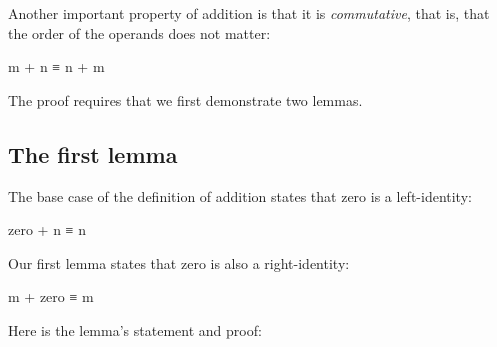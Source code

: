 Another important property of addition is that it is \emph{commutative},
that is, that the order of the operands does not matter:

\begin{myDisplay}
m + n ≡ n + m
\end{myDisplay}

The proof requires that we first demonstrate two lemmas.

\hypertarget{the-first-lemma}{%
\subsection{The first lemma}\label{the-first-lemma}}

The base case of the definition of addition states that zero is a
left-identity:

\begin{myDisplay}
zero + n ≡ n
\end{myDisplay}

Our first lemma states that zero is also a right-identity:

\begin{myDisplay}
m + zero ≡ m
\end{myDisplay}

Here is the lemma's statement and proof:

